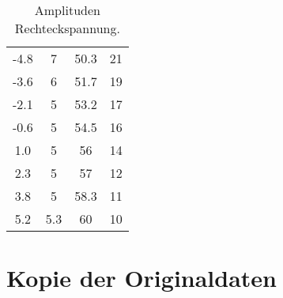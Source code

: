\begin{table}[h]
\begin{tabular}{S[table-format=3.1] S[table-format=2.10] S[table-format=2.1] S[table-format=2.1]}
    -4.8  & 7   & 50.3  & 21  \\
    -3.6  & 6   & 51.7  & 19  \\
    -2.1  & 5   & 53.2  & 17  \\
    -0.6  & 5   & 54.5  & 16  \\
    1.0   & 5   & 56    & 14  \\
    2.3   & 5   & 57    & 12  \\
    3.8   & 5   & 58.3  & 11  \\
    5.2   & 5.3 & 60    & 10  \\
    \bottomrule
  \end{tabular}
  \caption{Amplituden Rechteckspannung.}
  \label{tab:mess2}
\end{table}

\section{Kopie der Originaldaten}
